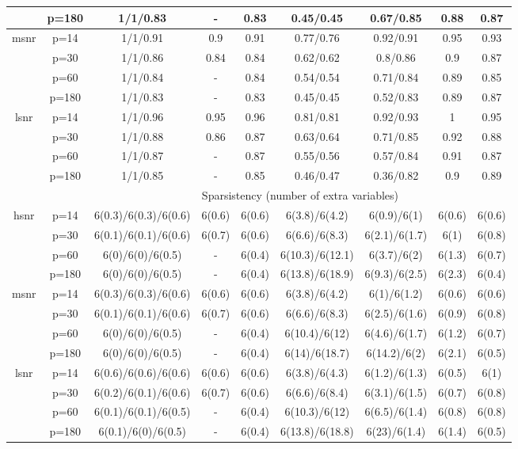 \begin{table}[ht]
{\begin{tabular}{|c|c|ccccccc|}
   & p=180 & 1/1/0.83 & - & 0.83 & 0.45/0.45 & 0.67/0.85 & 0.88 & 0.87 \\ 
  \midrule\multirow{4}[2]{*}{msnr} & p=14 & 1/1/0.91 & 0.9 & 0.91 & 0.77/0.76 & 0.92/0.91 & 0.95 & 0.93 \\ 
   & p=30 & 1/1/0.86 & 0.84 & 0.84 & 0.62/0.62 & 0.8/0.86 & 0.9 & 0.87 \\ 
   & p=60 & 1/1/0.84 & - & 0.84 & 0.54/0.54 & 0.71/0.84 & 0.89 & 0.85 \\ 
   & p=180 & 1/1/0.83 & - & 0.83 & 0.45/0.45 & 0.52/0.83 & 0.89 & 0.87 \\ 
  \midrule\multirow{4}[2]{*}{lsnr} & p=14 & 1/1/0.96 & 0.95 & 0.96 & 0.81/0.81 & 0.92/0.93 & 1 & 0.95 \\ 
   & p=30 & 1/1/0.88 & 0.86 & 0.87 & 0.63/0.64 & 0.71/0.85 & 0.92 & 0.88 \\ 
   & p=60 & 1/1/0.87 & - & 0.87 & 0.55/0.56 & 0.57/0.84 & 0.91 & 0.87 \\ 
   & p=180 & 1/1/0.85 & - & 0.85 & 0.46/0.47 & 0.36/0.82 & 0.9 & 0.89 \\ 
   \midrule 
 \multicolumn{1}{|c}{} &       & \multicolumn{7}{c|}{Sparsistency (number of extra variables)} \\
\midrule\multirow{4}[2]{*}{hsnr} & p=14 & 6(0.3)/6(0.3)/6(0.6) & 6(0.6) & 6(0.6) & 6(3.8)/6(4.2) & 6(0.9)/6(1) & 6(0.6) & 6(0.6) \\ 
   & p=30 & 6(0.1)/6(0.1)/6(0.6) & 6(0.7) & 6(0.6) & 6(6.6)/6(8.3) & 6(2.1)/6(1.7) & 6(1) & 6(0.8) \\ 
   & p=60 & 6(0)/6(0)/6(0.5) & - & 6(0.4) & 6(10.3)/6(12.1) & 6(3.7)/6(2) & 6(1.3) & 6(0.7) \\ 
   & p=180 & 6(0)/6(0)/6(0.5) & - & 6(0.4) & 6(13.8)/6(18.9) & 6(9.3)/6(2.5) & 6(2.3) & 6(0.4) \\ 
  \midrule\multirow{4}[2]{*}{msnr} & p=14 & 6(0.3)/6(0.3)/6(0.6) & 6(0.6) & 6(0.6) & 6(3.8)/6(4.2) & 6(1)/6(1.2) & 6(0.6) & 6(0.6) \\ 
   & p=30 & 6(0.1)/6(0.1)/6(0.6) & 6(0.7) & 6(0.6) & 6(6.6)/6(8.3) & 6(2.5)/6(1.6) & 6(0.9) & 6(0.8) \\ 
   & p=60 & 6(0)/6(0)/6(0.5) & - & 6(0.4) & 6(10.4)/6(12) & 6(4.6)/6(1.7) & 6(1.2) & 6(0.7) \\ 
   & p=180 & 6(0)/6(0)/6(0.5) & - & 6(0.4) & 6(14)/6(18.7) & 6(14.2)/6(2) & 6(2.1) & 6(0.5) \\ 
  \midrule\multirow{4}[2]{*}{lsnr} & p=14 & 6(0.6)/6(0.6)/6(0.6) & 6(0.6) & 6(0.6) & 6(3.8)/6(4.3) & 6(1.2)/6(1.3) & 6(0.5) & 6(1) \\ 
   & p=30 & 6(0.2)/6(0.1)/6(0.6) & 6(0.7) & 6(0.6) & 6(6.6)/6(8.4) & 6(3.1)/6(1.5) & 6(0.7) & 6(0.8) \\ 
   & p=60 & 6(0.1)/6(0.1)/6(0.5) & - & 6(0.4) & 6(10.3)/6(12) & 6(6.5)/6(1.4) & 6(0.8) & 6(0.8) \\ 
   & p=180 & 6(0.1)/6(0)/6(0.5) & - & 6(0.4) & 6(13.8)/6(18.8) & 6(23)/6(1.4) & 6(1.4) & 6(0.5) \\ 
   \bottomrule 
\end{tabular}
}
\end{table}
